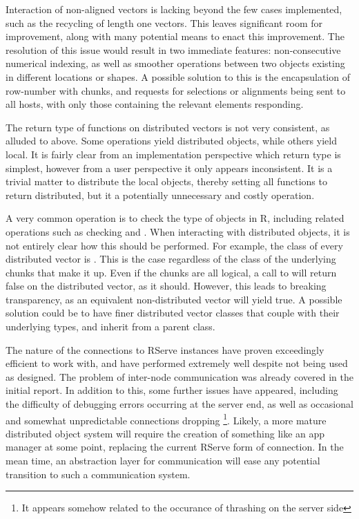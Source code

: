 Interaction of non-aligned vectors is lacking beyond the few cases
implemented, such as the recycling of length one vectors. This leaves
significant room for improvement, along with many potential means to
enact this improvement. The resolution of this issue would result in two
immediate features: non-consecutive numerical indexing, as well as
smoother operations between two objects existing in different locations
or shapes. A possible solution to this is the encapsulation of
row-number with chunks, and requests for selections or alignments being
sent to all hosts, with only those containing the relevant elements
responding.

The return type of functions on distributed vectors is not very
consistent, as alluded to above. Some operations yield
distributed objects, while others yield local. It is fairly clear from
an implementation perspective which return type is simplest, however
from a user perspective it only appears inconsistent. It is a trivial
matter to distribute the local objects, thereby setting all functions to
return distributed, but it a potentially unnecessary and costly
operation.

A very common operation is to check the type of objects in R, including
related operations such as checking  and
. When interacting with distributed objects, it is not
entirely clear how this should be performed. For example, the class of
every distributed vector is . This is the
case regardless of the class of the underlying chunks that make it up.
Even if the chunks are all logical, a call to  will
return false on the distributed vector, as it should. However, this
leads to breaking transparency, as an equivalent non-distributed vector
will yield true. A possible solution could be to have finer distributed
vector classes that couple with their underlying types, and inherit from
a parent  class.

The nature of the connections to RServe instances have proven
exceedingly efficient to work with, and have performed extremely well
despite not being used as designed. The problem of inter-node
communication was already covered in the initial report. In addition to
this, some further issues have appeared, including the difficulty of
debugging errors occurring at the server end, as well as occasional and
somewhat unpredictable connections dropping \footnote{It appears somehow
  related to the occurance of thrashing on the server side}. Likely, a
more mature distributed object system will require the creation of
something like an app manager at some point, replacing the current
RServe form of connection. In the mean time, an abstraction layer for
communication will ease any potential transition to such a communication
system.


